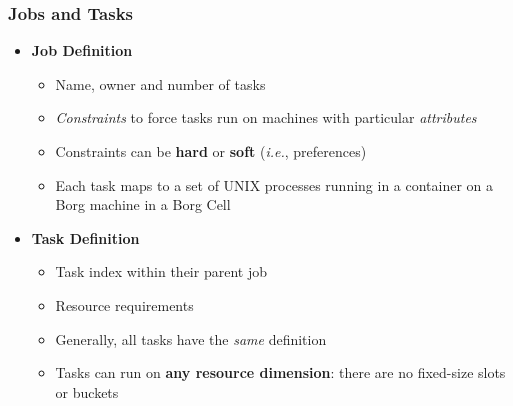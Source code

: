 \begin{frame}
\frametitle{Jobs and Tasks}
\begin{itemize}
	\item {\bf Job Definition}
	\begin{itemize}
		\item Name, owner and number of tasks
		\item {\it Constraints} to force tasks run on machines with particular {\it attributes}
		\item Constraints can be {\bf hard} or {\bf soft} ({\it i.e.}, preferences)
		\item Each task maps to a set of UNIX processes running in a container on a Borg machine in a Borg Cell
	\end{itemize}

\vspace{20pt}

	\item {\bf Task Definition}
	\begin{itemize}
		\item Task index within their parent job
		\item Resource requirements
		\item Generally, all tasks have the {\it same} definition
		\item Tasks can run on {\bf any resource dimension}: there are no fixed-size slots or buckets
	\end{itemize}
\end{itemize}
\end{frame}

